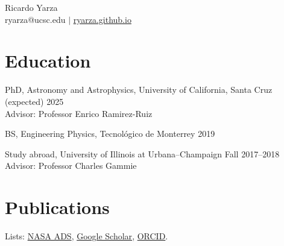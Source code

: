 \documentclass[12pt]{article}
\begin{document}
\begin{center}
{\Large Ricardo Yarza}\\\vspace{0.5em}
ryarza@ucsc.edu $|$ \href{https://ryarza.github.io}{ryarza.github.io}
\end{center}

\section*{Education}
PhD, Astronomy and Astrophysics, University of California, Santa Cruz \hfill (expected) 2025\\
Advisor: Professor Enrico Ramirez-Ruiz

BS, Engineering Physics, Tecnol\'{o}gico de Monterrey \hfill 2019

Study abroad, University of Illinois at Urbana--Champaign \hfill Fall 2017--2018\\
Advisor: Professor Charles Gammie

\section*{Publications}
Lists: \href{\adslibrary}{NASA ADS}, \href{\googlescholar}{Google Scholar}, \href{https://orcid.org/0000-0003-0381-1039}{ORCID}.

\begin{etaremune}[leftmargin=1.25em]

  
\end{etaremune}
\end{document}
